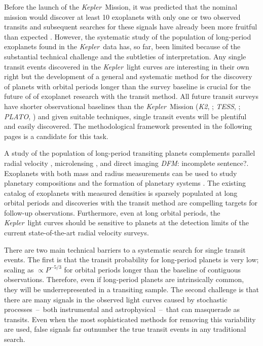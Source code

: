 \documentclass[manuscript, letterpaper]{aastex6}
\newcommand{\project}[1]{\textsl{#1}}
\newcommand{\kepler}{\project{Kepler}}
\newcommand{\KT}{\project{K2}}
\newcommand{\tess}{\project{TESS}}
\newcommand{\plato}{\project{PLATO}}
\newcommand{\todo}[3]{{\color{#2}\emph{#1}: #3}}
\newcommand{\dfmtodo}[1]{\todo{DFM}{red}{#1}}
\begin{document}
Before the launch of the \kepler\ Mission, it was predicted that the nominal
mission would discover at least 10 exoplanets with only one or two observed
transits \citep{Yee:2008} and subsequent searches for these signals have
already been more fruitful than expected \citep{Wang:2015, Uehara:2016}.
However, the systematic study of the population of long-period exoplanets
found in the \kepler\ data has, so far, been limited because of the
substantial technical challenge and the subtleties of interpretation.
Any single transit events discovered in the \kepler\ light curves are
interesting in their own right but the development of a general and systematic
method for the discovery of planets with orbital periods longer than the
survey baseline is crucial for the future of of exoplanet research with the
transit method.
All future transit surveys have shorter observational baselines than the
\kepler\ Mission (\KT, \citealt{Howell:2014}; \tess, \citealt{Ricker:2015};
\plato, \citealt{Rauer:2014}) and given suitable techniques, single transit
events will be plentiful and easily discovered.
The methodological framework presented in the following pages is a candidate
for this task.%

A study of the population of long-period transiting planets complements
parallel radial velocity \citep[for example][]{Cumming:2008,
Knutson:2014, Bryan:2016}, microlensing \citep[for
example][]{Gould:2010, Cassan:2012, Clanton:2014, Shvartzvald:2016}, and
direct imaging \citep[for example][]{Bowler:2016} \dfmtodo{incomplete sentence?}.
Exoplanets with both mass and radius measurements can be used to study
planetary compositions and the formation of planetary systems \citep[for
example][]{Weiss:2014, Rogers:2015, Wolfgang:2016}.
The existing catalog of exoplanets with measured densities is sparsely
populated at long orbital periods and discoveries with the transit method are
compelling targets for follow-up observations.
Furthermore, even at long orbital periods, the \kepler\ light curves should be
sensitive to planets at the detection limits of the current state-of-the-art
radial velocity surveys.

There are two main technical barriers to a systematic search for single
transit events.
The first is that the transit probability for long-period planets is very low;
scaling as $\propto P^{-5/3}$ for orbital periods longer than the
baseline of contiguous observations.
Therefore, even if long-period planets are intrinsically common, they will
be underrepresented in a transiting sample.
The second challenge is that there are many signals in the observed light
curves caused by stochastic processes~--~both instrumental and
astrophysical~--~that can masquerade as transits.
Even when the most sophisticated methods for removing this variability are
used, false signals far outnumber the true transit events in any traditional
search.
\end{document}
